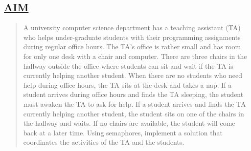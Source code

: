 \documentclass[a4paper, 12pt]{article}
\begin{document}
\subsection*{\underline{AIM}}
\begin{quote}
A university computer science department has a teaching assistant (TA) who helps under-graduate students with their programming assignments during regular office hours. The TA's office is rather small and has room for only one desk with a chair and computer. There are three chairs in the hallway outside the office where students can sit and wait if the TA is currently helping another student. When there are no students who need help during office hours, the TA sits at the desk and takes a nap. If a student arrives during office hours and finds the TA sleeping, the student must awaken the TA to ask for help. If a student arrives and finds the TA currently helping another student, the student sits on one of the chairs in the hallway and waits. If no chairs are available, the student will come back at a later time. Using semaphores, implement a solution that coordinates the activities of the TA and the students.
\end{quote}
\end{document}
